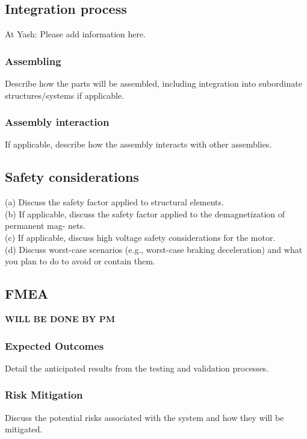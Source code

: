 \subsection{Integration process}

At Yash: Please add information here.

\subsubsection{Assembling}
Describe how the parts will be assembled, including integration into subordinate structures/systems if applicable.

\subsubsection{Assembly interaction}
If applicable, describe how the assembly interacts with other assemblies.



\subsection{Safety considerations }
(a) Discuss the safety factor applied to structural elements. \\
(b) If applicable, discuss the safety factor applied to the demagnetization of permanent mag-
nets.\\
(c) If applicable, discuss high voltage safety considerations for the motor.\\
(d) Discuss worst-case scenarios (e.g., worst-case braking deceleration) and what you plan
to do to avoid or contain them.\\

\subsection{FMEA}
\textbf{WILL BE DONE BY PM}

\subsubsection{Expected Outcomes}
Detail the anticipated results from the testing and validation processes.

\subsubsection{Risk Mitigation}
Discuss the potential risks associated with the system and how they will be mitigated.


